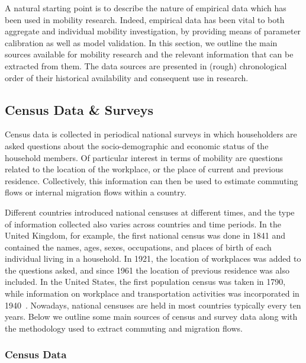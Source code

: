 
A natural starting point is to describe the nature of empirical data which has been used in mobility research. Indeed, empirical data has been vital to both aggregate and individual mobility investigation, by providing means of parameter calibration as well as model validation. In this section, we outline the main sources available for mobility research and the relevant information that can be extracted from them. The data sources are presented in (rough) chronological order of their historical availability and consequent use in research.

\subsection{Census Data \& Surveys}
\label{sec:census}

Census data is collected in periodical national surveys in which householders are asked questions about the socio-demographic and economic status of the household members. Of particular interest in terms of mobility are questions related to the location of the workplace, or the place of current and previous residence. Collectively, this information can then be used to estimate commuting flows or internal migration flows within a country.

Different countries introduced national censuses at different times, and the type of information collected also varies across countries and time periods. In the United Kingdom, for example, the first national census was done in 1841 and contained the names, ages, sexes, occupations, and places of birth of each individual living in a household. In 1921, the location of workplaces was added to the questions asked, and since 1961 the location of previous residence was also included. In the United States, the first population census was taken in 1790, while information on workplace and transportation activities was incorporated in 1940~\cite{potter_2010_new}. Nowadays, national censuses are held in most countries typically every ten years. Below we outline some main sources of census and survey data along with the methodology used to extract commuting and migration flows.

\subsubsection{Census Data}

